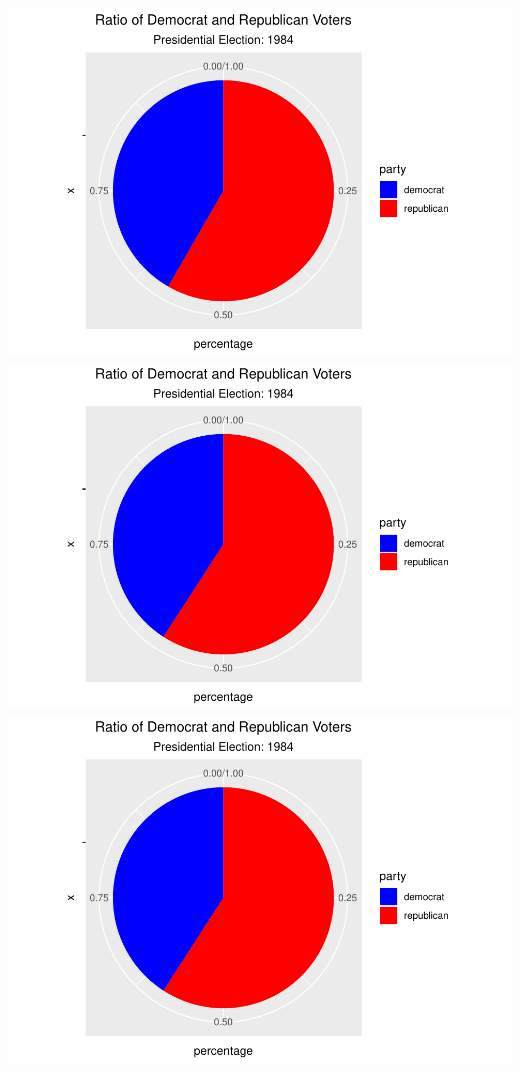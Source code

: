 \documentclass[
]{article}
\begin{document}
\includegraphics{election_files/figure-latex/anim-19.pdf}
\includegraphics{election_files/figure-latex/anim-20.pdf}
\includegraphics{election_files/figure-latex/anim-21.pdf}
\end{document}
